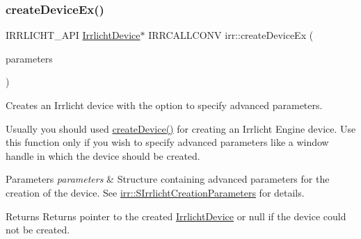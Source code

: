 \subsubsection{\texorpdfstring{create\+Device\+Ex()}{createDeviceEx()}}
{\footnotesize\ttfamily I\+R\+R\+L\+I\+C\+H\+T\+\_\+\+A\+PI \hyperlink{classirr_1_1IrrlichtDevice}{Irrlicht\+Device}$\ast$ I\+R\+R\+C\+A\+L\+L\+C\+O\+NV irr\+::create\+Device\+Ex (\begin{DoxyParamCaption}\item[{const \hyperlink{structirr_1_1SIrrlichtCreationParameters}{S\+Irrlicht\+Creation\+Parameters} \&}]{parameters }\end{DoxyParamCaption})}



Creates an Irrlicht device with the option to specify advanced parameters. 

Usually you should used \hyperlink{namespaceirr_abaf4d8719cc26b0d30813abf85e47c76}{create\+Device()} for creating an Irrlicht Engine device. Use this function only if you wish to specify advanced parameters like a window handle in which the device should be created. 
\begin{DoxyParams}{Parameters}
{\em parameters} & Structure containing advanced parameters for the creation of the device. See \hyperlink{structirr_1_1SIrrlichtCreationParameters}{irr\+::\+S\+Irrlicht\+Creation\+Parameters} for details. \\
\hline
\end{DoxyParams}
\begin{DoxyReturn}{Returns}
Returns pointer to the created \hyperlink{classirr_1_1IrrlichtDevice}{Irrlicht\+Device} or null if the device could not be created. 
\end{DoxyReturn}
